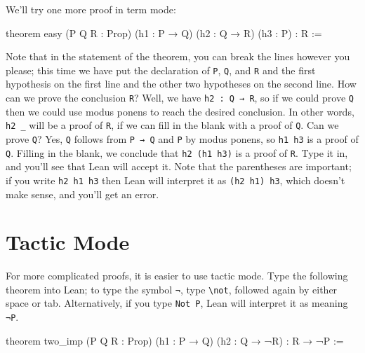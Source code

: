 \documentclass[
  letterpaper,
  DIV=11,
  numbers=noendperiod]{scrreprt}
\newenvironment{Shaded}{\begin{snugshade}}{\end{snugshade}}
\newcommand{\KeywordTok}[1]{\textcolor[rgb]{0.00,0.23,0.31}{#1}}
\newcommand{\NormalTok}[1]{\textcolor[rgb]{0.00,0.23,0.31}{#1}}
\renewcommand{\NormalTok}[1]{\textcolor[HTML]{000000}{#1}}
\renewcommand{\KeywordTok}[1]{\textcolor[HTML]{0000FF}{#1}}
\theoremstyle{remark}
\begin{document}
We'll try one more proof in term mode:

\begin{Shaded}
\begin{Highlighting}[]
\KeywordTok{theorem}\NormalTok{ easy (P Q R : }\KeywordTok{Prop}\NormalTok{) (h1 : P → Q)}
\NormalTok{(h2 : Q → R) (h3 : P) : R :=}
\end{Highlighting}
\end{Shaded}

Note that in the statement of the theorem, you can break the lines
however you please; this time we have put the declaration of \texttt{P},
\texttt{Q}, and \texttt{R} and the first hypothesis on the first line
and the other two hypotheses on the second line. How can we prove the
conclusion \texttt{R}? Well, we have \texttt{h2\ :\ Q\ →\ R}, so if we
could prove \texttt{Q} then we could use modus ponens to reach the
desired conclusion. In other words, \texttt{h2\ \_} will be a proof of
\texttt{R}, if we can fill in the blank with a proof of \texttt{Q}. Can
we prove \texttt{Q}? Yes, \texttt{Q} follows from \texttt{P\ →\ Q} and
\texttt{P} by modus ponens, so \texttt{h1\ h3} is a proof of \texttt{Q}.
Filling in the blank, we conclude that \texttt{h2\ (h1\ h3)} is a proof
of \texttt{R}. Type it in, and you'll see that Lean will accept it. Note
that the parentheses are important; if you write \texttt{h2\ h1\ h3}
then Lean will interpret it as \texttt{(h2\ h1)\ h3}, which doesn't make
sense, and you'll get an error.

\hypertarget{tactic-mode}{%
\section*{Tactic Mode}\label{tactic-mode}}

For more complicated proofs, it is easier to use tactic mode. Type the
following theorem into Lean; to type the symbol \texttt{¬}, type
\texttt{\textbackslash{}not}, followed again by either space or tab.
Alternatively, if you type \texttt{Not\ P}, Lean will interpret it as
meaning \texttt{¬P}.

\begin{Shaded}
\begin{Highlighting}[]
\KeywordTok{theorem}\NormalTok{ two\_imp (P Q R : }\KeywordTok{Prop}\NormalTok{)}
\NormalTok{(h1 : P → Q) (h2 : Q → ¬R) : R → ¬P :=}
\end{Highlighting}
\end{Shaded}
\end{document}
